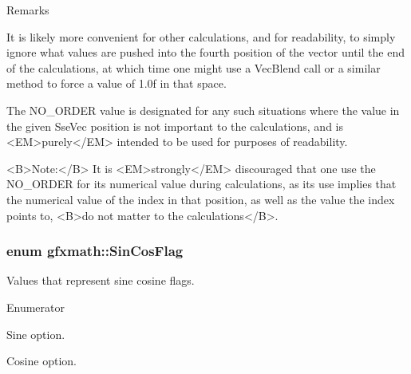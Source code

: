 \begin{Desc}
\begin{description}
\begin{DoxyRemark}{Remarks}
\begin{DoxyVerb}
          It is likely more convenient for other calculations, and for readability, to simply ignore what
          values are pushed into the fourth position of the vector until the end of the calculations, at
          which time one might use a VecBlend call or a similar method to force a value of 1.0f in that
          space.

          The NO_ORDER value is designated for any such situations where the value in the given SseVec position
          is not important to the calculations, and is <EM>purely</EM> intended to be used for purposes of
          readability.

          <B>Note:</B> It is <EM>strongly</EM> discouraged that one use the NO_ORDER for its numerical value during calculations,
          as its use implies that the numerical value of the index in that position, as well as the value the index points 
          to, <B>do not matter to the calculations</B>.\end{DoxyVerb}
 
\end{DoxyRemark}
\end{description}
\end{Desc}
\hypertarget{namespacegfxmath_ac97be114298a04e9db7f993085667b00}{}
\subsubsection[{Sin\+Cos\+Flag}]{\setlength{\rightskip}{0pt plus 5cm}enum {\bf gfxmath\+::\+Sin\+Cos\+Flag}}\label{namespacegfxmath_ac97be114298a04e9db7f993085667b00}


Values that represent sine cosine flags. 

\begin{Desc}
\item[Enumerator]\par
\begin{description}
\item[{\em 
\hypertarget{namespacegfxmath_ac97be114298a04e9db7f993085667b00ac25dc94e5f333f4dc6ead2b93687bfcc}{}S\+I\+N\label{namespacegfxmath_ac97be114298a04e9db7f993085667b00ac25dc94e5f333f4dc6ead2b93687bfcc}
}]Sine option. \item[{\em 
\hypertarget{namespacegfxmath_ac97be114298a04e9db7f993085667b00a46197a43f8fe8efbdae8c2670975d2e7}{}C\+O\+S\label{namespacegfxmath_ac97be114298a04e9db7f993085667b00a46197a43f8fe8efbdae8c2670975d2e7}
}]Cosine option. \end{description}
\end{Desc}
\hypertarget{namespacegfxmath_a8930e63e96e91796ede30a8378b19d0b}{}
